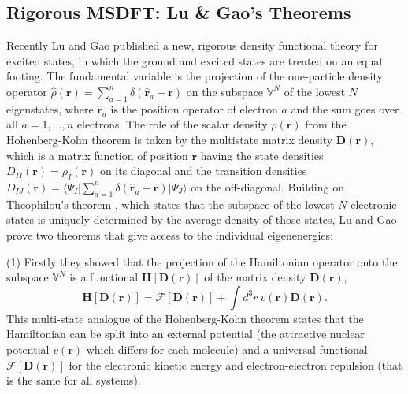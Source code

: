 \documentclass[journal=jpclcd,manuscript=letter]{achemso}
\newcommand\m[1]{\mathbf{#1}}
\renewcommand\vec[1]{\mathbf{#1}}
\begin{document}
\subsection{Rigorous MSDFT: Lu \& Gao's Theorems
\label{sec:lu_gao_theorems}
}
Recently Lu and Gao \cite{Lu2022JPCL} published a new, rigorous density functional theory for excited states, in which the ground
and excited states are treated on an equal footing. The fundamental variable is the projection
of the one-particle density operator $\hat{\rho}(\vec{r}) = \sum_{a=1}^{n} \delta(\hat{\vec{r}}_a - \vec{r})$ on the subspace
$\mathbb{V}^N$ of the lowest $N$ eigenstates, where $\hat{\vec{r}}_a$ is the position operator of electron $a$
and the sum goes over all $a=1,\ldots,n$ electrons.
The role of the scalar density $\rho(\vec{r})$
from the Hohenberg-Kohn theorem is taken by the multistate matrix density $\m{D}(\vec{r})$,
which is a matrix function of position $\vec{r}$
having the state densities $D_{II}(\vec{r}) = \rho_{I}(\vec{r})$ on its diagonal and the transition densities
$D_{IJ}(\vec{r}) = \langle \Psi_I \vert \sum_{a=1}^{n} \delta(\hat{\vec{r}}_a - \vec{r}) \vert \Psi_J \rangle$ on the off-diagonal.
Building on Theophilou's theorem \cite{Theophilou1979}, which states that the subspace of the lowest $N$ electronic states is uniquely
determined by the average density of those states, Lu and Gao prove two theorems that give access to the individual eigenenergies:

(1) Firstly they showed that the projection of the Hamiltonian operator onto the subspace $\mathbb{V}^N$ is a functional $\m{H}[\m{D}(\vec{r})]$ of the
matrix density $\m{D}(\vec{r})$, \cite[theorem 1]{Lu2022JPCL}
\begin{equation}
  \m{H}[\m{D}(\vec{r})] = \m{\mathcal{F}}[\m{D}(\vec{r})] + \int d^3\!r ~ v(\vec{r}) \m{D}(\vec{r}).
 \end{equation}
 This multi-state analogue of the Hohenberg-Kohn theorem states that the Hamiltonian can be split into an
external potential (the attractive nuclear potential $v(\vec{r})$ which differs for each molecule)
and a universal functional $\m{\mathcal{F}}[\m{D}(\vec{r})]$ for the
electronic kinetic energy and electron-electron repulsion (that is the same for all systems).
 
\end{document}
